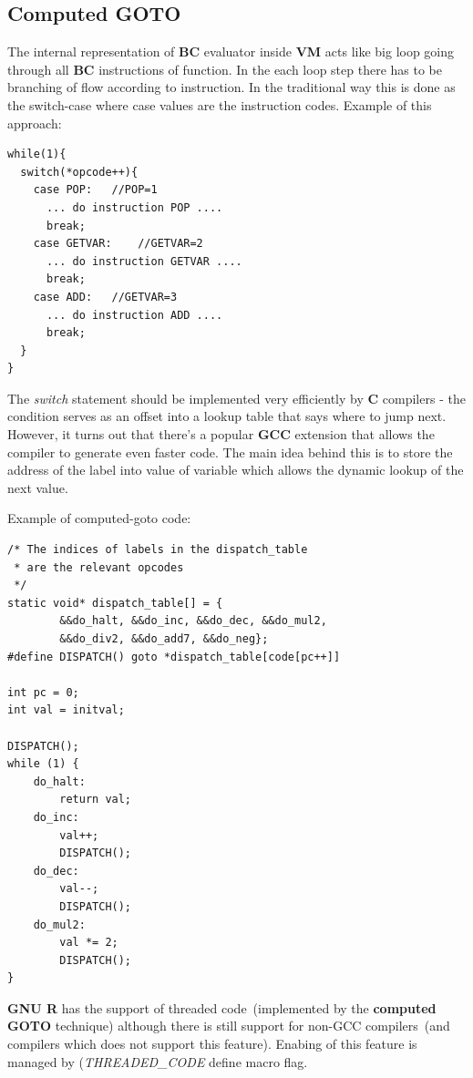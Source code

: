 \documentclass[thesis=M,english]{FITthesis}[2018/10/20]
\begin{document}
\subsection{Computed GOTO}\label{Computed-GOTO}

The internal representation of \textbf{BC} evaluator inside \textbf{VM} acts like big loop going through all \textbf{BC} instructions of function. In the each loop step there has to be branching of flow according to instruction. In the traditional way this is done as the switch-case where case values are the instruction codes. Example of this approach:

\begin{lstlisting}
while(1){
  switch(*opcode++){
    case POP:	//POP=1
      ... do instruction POP ....
      break;
    case GETVAR:	//GETVAR=2
      ... do instruction GETVAR ....
      break;
    case ADD:	//GETVAR=3
      ... do instruction ADD ....
      break;
  }
}
\end{lstlisting}

The \textit{switch} statement should be implemented very efficiently by \textbf{C} compilers - the condition serves as an offset into a lookup table that says where to jump next. However, it turns out that there's a popular \textbf{GCC} extension that allows the compiler to generate even faster code. The main idea behind this is to store the address of the label into value of variable which allows the dynamic lookup of the next value.

Example of computed-goto code:
\begin{lstlisting}
/* The indices of labels in the dispatch_table 
 * are the relevant opcodes
 */
static void* dispatch_table[] = {
        &&do_halt, &&do_inc, &&do_dec, &&do_mul2,
        &&do_div2, &&do_add7, &&do_neg};
#define DISPATCH() goto *dispatch_table[code[pc++]]

int pc = 0;
int val = initval;

DISPATCH();
while (1) {
    do_halt:
        return val;
    do_inc:
        val++;
        DISPATCH();
    do_dec:
        val--;
        DISPATCH();
    do_mul2:
        val *= 2;
        DISPATCH();
}
\end{lstlisting}

\textbf{GNU R} has the support of threaded code~(implemented by the \textbf{computed GOTO} technique) although there is still support for non-GCC compilers~(and compilers which does not support this feature). Enabing of this feature is managed by (\textit{THREADED{\_}CODE} define macro flag. 
\end{document}
